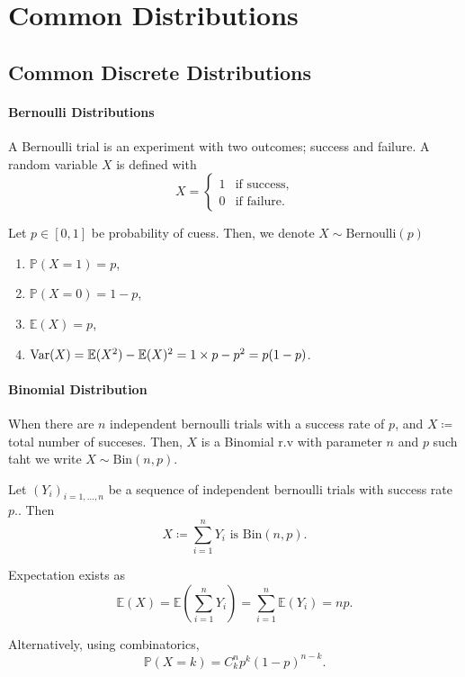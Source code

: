 \section{Common Distributions}

\subsection{Common Discrete Distributions}

\paragraph{Bernoulli Distributions}
A Bernoulli trial is an experiment with two outcomes;
success and failure.
A random variable \(X\) is defined with
\[
    X = \begin{cases}
        1 & \text{if  success}, \\
        0 & \text{if  failure}.
    \end{cases}
\]

Let \(p\in[0, 1]\) be probability of cuess. Then, we denote
\(X\sim \text{Bernoulli}(p)\)
\begin{enumerate}
    \item \(\mathbb{P}(X = 1) = p\),
    \item \(\mathbb{P}(X=0)  = 1-p\),
    \item \(\mathbb{E}(X) = p\),
    \item \(\mathrm{Var}(X) = \mathbb{E}(X^2) - \mathbb{E}(X)^2 = 1\times p - p^2 =
    p(1-p)\).
\end{enumerate}

\paragraph{Binomial Distribution}
When there are \(n\) independent bernoulli trials with
a success rate of \(p\), and \(X \coloneqq\) total number of succeses.
Then, \(X\) is a Binomial r.v with parameter \(n\) and \(p\)
such taht we write \(X\sim \text{Bin}(n, p)\).

Let \((Y_i)_{i=1, \dots, n}\) be a sequence of independent
bernoulli trials with success rate \(p\)..
Then \[
    X \coloneqq \sum_{i=1}^n Y_i \text{ is } \text{Bin}(n, p).
\]

Expectation exists as \[
    \mathbb{E}(X)
    = \mathbb{E}\left(\sum_{i=1}^{n} Y_i\right)
    = \sum_{i=1}^{n} \mathbb{E}(Y_i) = np.
\]

Alternatively, using combinatorics,
\[
    \mathbb{P}(X=k) = C^{n}_{k} p^k (1-p)^{n-k}.
\]

